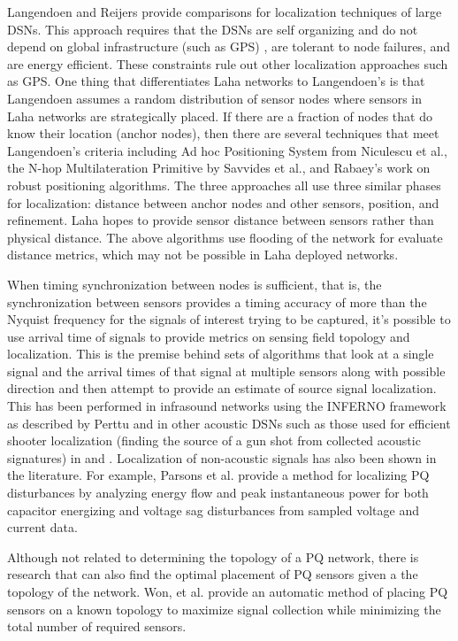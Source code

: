 Langendoen and Reijers\cite{langendoen2003distributed} provide comparisons for localization techniques of large DSNs. This approach requires that the DSNs are self organizing and do not depend on global infrastructure (such as GPS) , are tolerant to node failures, and are energy efficient. These constraints rule out other localization approaches such as GPS. One thing that differentiates Laha networks to Langendoen's is that Langendoen assumes a random distribution of sensor nodes where sensors in Laha networks are strategically placed. If there are a fraction of nodes that do know their location (anchor nodes), then there are several techniques that meet Langendoen's criteria including Ad hoc Positioning System from Niculescu et al.\cite{niculescu2003ad}, the N-hop Multilateration Primitive by Savvides et al.\cite{savvides2002bits}, and Rabaey's work on robust positioning algorithms\cite{rabaey2002robust}. The three approaches all use three similar phases for localization: distance between anchor nodes and other sensors, position, and refinement. Laha hopes to provide sensor distance between sensors rather than physical distance. The above algorithms use flooding of the network for evaluate distance metrics, which may not be possible in Laha deployed networks.

When timing synchronization between nodes is sufficient, that is, the synchronization between sensors provides a timing accuracy of more than the Nyquist frequency for the signals of interest trying to be captured, it's possible to use arrival time of signals to provide metrics on sensing field topology and localization. This is the premise behind sets of algorithms that look at a single signal and the arrival times of that signal at multiple sensors along with possible direction and then attempt to provide an estimate of source signal localization. This has been performed in infrasound networks using the INFERNO framework as described by Perttu\cite{perttu2013regional} and in other acoustic DSNs such as those used for efficient shooter localization (finding the source of a gun shot from collected acoustic signatures) in \cite{gezici2005localization} and \cite{maroti2004shooter}. Localization of non-acoustic signals has also been shown in the literature. For example, Parsons et al. provide a method for localizing PQ disturbances by analyzing energy flow and peak instantaneous power for both capacitor energizing  and voltage sag disturbances from sampled voltage and current data\cite{parsons1998direction}.

Although not related to determining the topology of a PQ network, there is research that can also find the optimal placement of PQ sensors given a the topology of the network. Won, et al.\cite{won2008optimal} provide an automatic method of placing PQ sensors on a known topology to maximize signal collection while minimizing the total number of required sensors.


